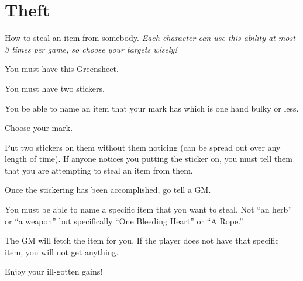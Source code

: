 \documentclass[green]{guildcamp2}
\begin{document}
\name{\gTheft{}}

\section{Theft}
How to steal an item from somebody. \emph{Each character can use this ability at most 3 times per game, so choose your targets wisely!}

\begin{enum}[Requirements]
	\item You must have this Greensheet.
	\item You must have two stickers.
	\item You be able to name an item that your mark has which is one hand bulky or less.
\end{enum}

\begin{enum}[Directions]
	\item Choose your mark.
	\item Put two stickers on them without them noticing (can be spread out over any length of time). If anyone notices you putting the sticker on, you must tell them that you are attempting to steal an item from them.
	\item Once the stickering has been accomplished, go tell a GM.
	\item You must be able to name a specific item that you want to steal. Not ``an herb'' or ``a weapon'' but specifically ``One Bleeding Heart'' or ``A Rope.''
	\item The GM will fetch the item for you. If the player does not have that specific item, you will not get anything.
	\item Enjoy your ill-gotten gains!	
\end{enum}
	
\end{document}
